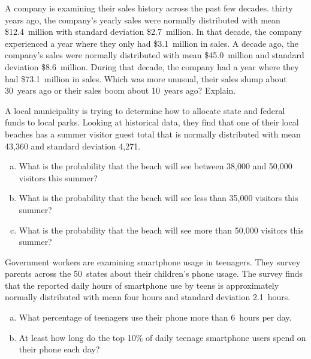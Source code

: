 \documentclass[11pt,letterpaper]{article}
\begin{document}

 A company is examining their sales history across the past few decades. thirty years ago, the company's yearly sales were normally distributed with mean \$12.4~million with standard deviation \$2.7~million. In that decade, the company experienced a year where they only had \$3.1~million in sales. A decade ago, the company's sales were normally distributed with mean \$45.0~million and standard deviation \$8.6~million. During that decade, the company had a year where they had \$73.1~million in sales. Which was more unusual, their sales slump about 30~years ago or their sales boom about 10~years ago? Explain. 



\newpage



 A local municipality is trying to determine how to allocate state and federal funds to local parks. Looking at historical data, they find that one of their local beaches has a summer visitor guest total that is normally distributed with mean 43,360 and standard deviation 4,271. 
	\begin{enumerate}[(a)]
	\item What is the probability that the beach will see between 38,000 and 50,000 visitors this summer?
	\item What is the probability that the beach will see less than 35,000 visitors this summer?
	\item What is the probability that the beach will see more than 50,000 visitors this summer? 
	\end{enumerate}



\newpage



 Government workers are examining smartphone usage in teenagers. They survey parents across the 50~states about their children's phone usage. The survey finds that the reported daily hours of smartphone use by teens is approximately normally distributed with mean four hours and standard deviation 2.1~hours. 
	\begin{enumerate}[(a)]
	\item What percentage of teenagers use their phone more than 6~hours per day.
	\item At least how long do the top 10\% of daily teenage smartphone users spend on their phone each day?
	\end{enumerate}
\end{document}
